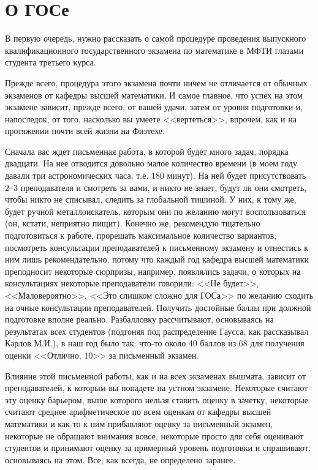 \chapter[О ГОСе]{О ГОСе\footnotemark}
В первую очередь, нужно рассказать о самой процедуре проведения выпускного квалификационного государственного экзамена по математике в МФТИ глазами студента третьего курса. 

Прежде всего, процедура этого экзамена почти ничем не отличается от обычных экзаменов от кафедры высшей математики. 
И самое главное, что успех на этом экзамене зависит, прежде всего, от вашей удачи, затем от уровня подготовки и, напоследок, от того, насколько вы умеете <<вертеться>>, впрочем, как и на протяжении почти всей жизни на Физтехе.

Сначала вас ждет письменная работа, в которой будет много задач, порядка двадцати. На нее отводится довольно малое количество времени (в моем году давали три астрономических часа, т.е. 180 минут). На ней будет присутствовать 2--3 преподавателя и смотреть за вами, и никто не знает, будут ли они смотреть, чтобы никто не списывал, следить за глобальной тишиной. У них, к тому же, будет ручной металлоискатель, которым они по желанию могут воспользоваться (он, кстати, неприятно пищит). Конечно же, рекомендую тщательно подготовиться к работе, прорешать максимальное количество вариантов, посмотреть консультации преподавателей к письменному экзамену и отнестись к ним лишь рекомендательно, потому что каждый год кафедра высшей математики преподносит некоторые сюрпризы, например, появлялись задачи, о которых на консультациях некоторые преподаватели говорили: <<Не будет>>, <<Маловероятно>>, <<Это слишком сложно для ГОСа>> по желанию сходить на очные консультации преподавателей. Получить достойные баллы при должной подготовке вполне реально. Разбалловку рассчитывают, основываясь на результатах всех студентов (подгоняя под распределение Гаусса, как рассказывал Карлов М.И.), в наш год было так: что-то около 40 баллов из 68 для получения оценки <<Отлично, 10>> за письменный экзамен.

Влияние этой письменной работы, как и на всех экзаменах вышмата, зависит от преподавателей, к которым вы попадете на устном экзамене. Некоторые считают эту оценку барьером, выше которого нельзя ставить оценку в зачетку, некоторые считают среднее арифметическое по всем оценкам от кафедры высшей математики и как-то к ним прибавляют оценку за письменный экзамен, некоторые не обращают внимания вовсе, некоторые просто для себя оценивают студентов и принимают оценку за примерный уровень подготовки и спрашивают, основываясь на этом. Все, как всегда, не определено заранее.

